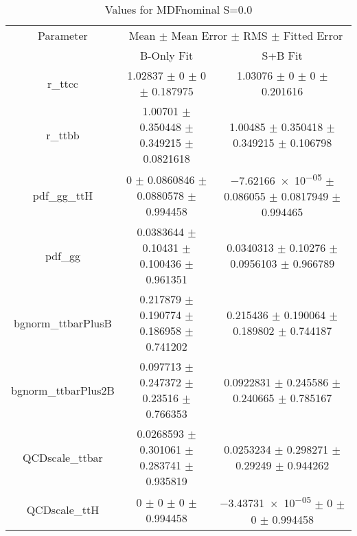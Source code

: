 \begin{table}
\centering
\caption{Values for MDFnominal S=0.0}
\begin{tabular}{ccc}
\toprule
Parameter & \multicolumn{2}{c}{Mean $\pm$ Mean Error $\pm$ RMS $\pm$ Fitted Error}\\
 & B-Only Fit & S+B Fit\\
\midrule
r\_ttcc & \num{1.02837} $\pm$ \num{0} $\pm$ \num{0} $\pm$ \num{0.187975} & \num{1.03076} $\pm$ \num{0} $\pm$ \num{0} $\pm$ \num{0.201616}\\
r\_ttbb & \num{1.00701} $\pm$ \num{0.350448} $\pm$ \num{0.349215} $\pm$ \num{0.0821618} & \num{1.00485} $\pm$ \num{0.350418} $\pm$ \num{0.349215} $\pm$ \num{0.106798}\\
pdf\_gg\_ttH & \num{0} $\pm$ \num{0.0860846} $\pm$ \num{0.0880578} $\pm$ \num{0.994458} & \num{-7.62166e-05} $\pm$ \num{0.086055} $\pm$ \num{0.0817949} $\pm$ \num{0.994465}\\
pdf\_gg & \num{0.0383644} $\pm$ \num{0.10431} $\pm$ \num{0.100436} $\pm$ \num{0.961351} & \num{0.0340313} $\pm$ \num{0.10276} $\pm$ \num{0.0956103} $\pm$ \num{0.966789}\\
bgnorm\_ttbarPlusB & \num{0.217879} $\pm$ \num{0.190774} $\pm$ \num{0.186958} $\pm$ \num{0.741202} & \num{0.215436} $\pm$ \num{0.190064} $\pm$ \num{0.189802} $\pm$ \num{0.744187}\\
bgnorm\_ttbarPlus2B & \num{0.097713} $\pm$ \num{0.247372} $\pm$ \num{0.23516} $\pm$ \num{0.766353} & \num{0.0922831} $\pm$ \num{0.245586} $\pm$ \num{0.240665} $\pm$ \num{0.785167}\\
QCDscale\_ttbar & \num{0.0268593} $\pm$ \num{0.301061} $\pm$ \num{0.283741} $\pm$ \num{0.935819} & \num{0.0253234} $\pm$ \num{0.298271} $\pm$ \num{0.29249} $\pm$ \num{0.944262}\\
QCDscale\_ttH & \num{0} $\pm$ \num{0} $\pm$ \num{0} $\pm$ \num{0.994458} & \num{-3.43731e-05} $\pm$ \num{0} $\pm$ \num{0} $\pm$ \num{0.994458}\\
\bottomrule
\end{tabular}
\end{table}
